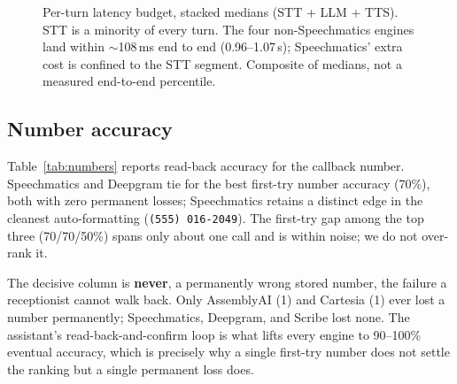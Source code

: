\documentclass[11pt]{article}
\begin{document}
\begin{figure}[ht]
\centering
{}
\caption{Per-turn latency budget, stacked medians (STT + LLM + TTS). STT is a
minority of every turn. The four non-Speechmatics engines land within
$\sim$108\,ms end to end (0.96--1.07\,s); Speechmatics' extra cost is confined
to the STT segment. Composite of medians, not a measured end-to-end percentile.}
\label{fig:stack}
\end{figure}

\subsection{Number accuracy}
\label{sec:numbers}

Table~\ref{tab:numbers} reports read-back accuracy for the callback number.
Speechmatics and Deepgram tie for the best first-try number accuracy (70\%),
both with zero permanent losses; Speechmatics retains a distinct edge in the
cleanest auto-formatting (\texttt{(555)\,016-2049}). The first-try gap among the
top three (70/70/50\%) spans only about one call and is within noise; we do not
over-rank it.

The decisive column is \textbf{never}, a permanently wrong stored number, the
failure a receptionist cannot walk back. Only AssemblyAI (1) and Cartesia (1)
ever lost a number permanently; Speechmatics, Deepgram, and Scribe lost none.
The assistant's read-back-and-confirm loop is what lifts every engine to
90--100\% eventual accuracy, which is precisely why a single first-try number
does not settle the ranking but a single permanent loss does.
\end{document}
